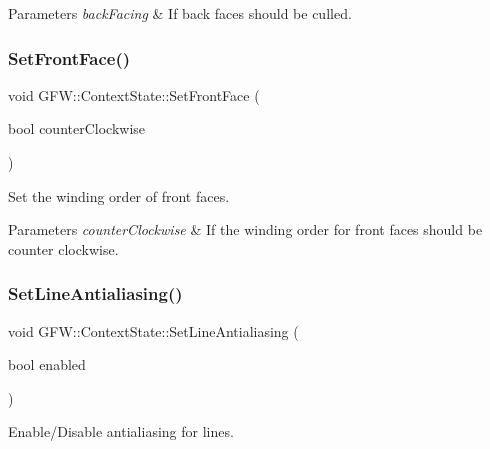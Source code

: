 \begin{DoxyParams}{Parameters}
{\em back\+Facing} & If back faces should be culled. \\
\hline
\end{DoxyParams}
\mbox{\label{class_g_f_w_1_1_context_state_a16c6663de05bd0fbc054fd86f6e4ccd9}} 
\subsubsection{\texorpdfstring{Set\+Front\+Face()}{SetFrontFace()}}
{\footnotesize\ttfamily void G\+F\+W\+::\+Context\+State\+::\+Set\+Front\+Face (\begin{DoxyParamCaption}\item[{bool}]{counter\+Clockwise }\end{DoxyParamCaption})}



Set the winding order of front faces. 


\begin{DoxyParams}{Parameters}
{\em counter\+Clockwise} & If the winding order for front faces should be counter clockwise. \\
\hline
\end{DoxyParams}
\mbox{\label{class_g_f_w_1_1_context_state_adacd3a218340e71e104b8a40cf3b8919}} 
\subsubsection{\texorpdfstring{Set\+Line\+Antialiasing()}{SetLineAntialiasing()}}
{\footnotesize\ttfamily void G\+F\+W\+::\+Context\+State\+::\+Set\+Line\+Antialiasing (\begin{DoxyParamCaption}\item[{bool}]{enabled }\end{DoxyParamCaption})}



Enable/\+Disable antialiasing for lines. 


